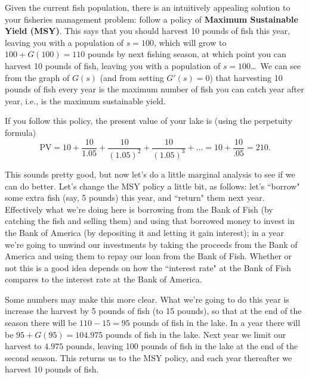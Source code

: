 Given the current fish population, there is an intuitively appealing solution to your fisheries management problem: follow a policy of \textbf{Maximum Sustainable Yield (MSY)}. This says that you should harvest 10 pounds of fish this year, leaving you with a population of $s=100$, which will grow to $100+G(100)=110$ pounds by next fishing season, at which point you can harvest 10 pounds of fish, leaving you with a population of $s=100$\ldots\ We can see from the graph of $G(s)$ (and from setting $G'(s)=0$) that harvesting 10 pounds of fish every year is the maximum number of fish you can catch year after year, i.e., is the maximum sustainable yield.

If you follow this policy, the present value of your lake is (using the perpetuity formula)
\[
\mbox{PV} = 10 +
\frac{10}{1.05}+\frac{10}{(1.05)^2}+\frac{10}{(1.05)^3}+\ldots =
10+\frac{10}{.05} = 210.
\]

This sounds pretty good, but now let's do a little marginal analysis to see if we can do better. Let's change the MSY policy a little bit, as follows: let's ``borrow" some extra fish (say, 5 pounds) this year, and ``return" them next year. Effectively what we're doing here is borrowing from the Bank of Fish (by catching the fish and selling them) and using that borrowed money to invest in the Bank of America (by depositing it and letting it gain interest); in a year we're going to unwind our investments by taking the proceeds from the Bank of America and using them to repay our loan from the Bank of Fish. Whether or not this is a good idea depends on how the ``interest rate" at the Bank of Fish compares to the interest rate at the Bank of America.

Some numbers may make this more clear. What we're going to do this year is increase the harvest by 5 pounds of fish (to 15 pounds), so that at the end of the season there will be $110-15=95$ pounds of fish in the lake. In a year there will be $95+G(95)=104.975$ pounds of fish in the lake. Next year we limit our harvest to $4.975$ pounds, leaving 100 pounds of fish in the lake at the end of the second season. This returns us to the MSY policy, and each year thereafter we harvest 10 pounds of fish.

